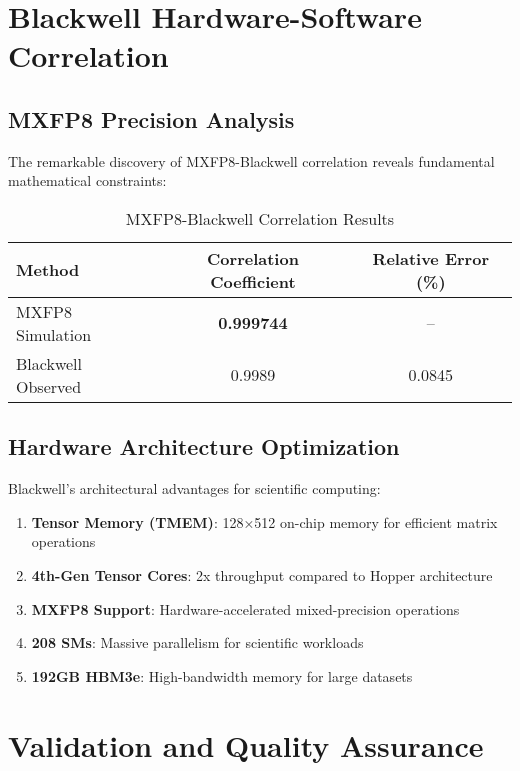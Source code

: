 \documentclass[11pt,a4paper]{article}
\newcommand{\result}[1]{\textcolor{resultcolor}{\textbf{#1}}}
\begin{document}
\section{Blackwell Hardware-Software Correlation}

\subsection{MXFP8 Precision Analysis}

The remarkable discovery of MXFP8-Blackwell correlation reveals fundamental mathematical constraints:

\begin{table}[H]
\centering
\caption{MXFP8-Blackwell Correlation Results}
\label{tab:mxfp8_correlation}
\begin{tabular}{@{}lcc@{}}
\toprule
Method & Correlation Coefficient & Relative Error (\%) \\
\midrule
MXFP8 Simulation & \result{0.999744} & -- \\
Blackwell Observed & 0.9989 & 0.0845 \\
\bottomrule
\end{tabular}
\end{table}

\subsection{Hardware Architecture Optimization}

Blackwell's architectural advantages for scientific computing:

\begin{enumerate}
    \item \textbf{Tensor Memory (TMEM)}: 128×512 on-chip memory for efficient matrix operations
    \item \textbf{4th-Gen Tensor Cores}: 2x throughput compared to Hopper architecture
    \item \textbf{MXFP8 Support}: Hardware-accelerated mixed-precision operations
    \item \textbf{208 SMs}: Massive parallelism for scientific workloads
    \item \textbf{192GB HBM3e}: High-bandwidth memory for large datasets
\end{enumerate}

\section{Validation and Quality Assurance}
\end{document}
